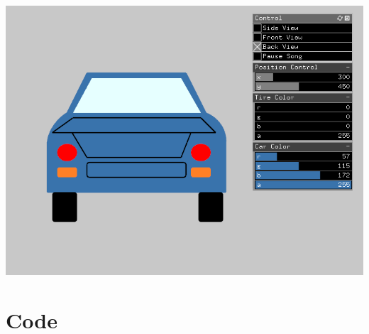 \documentclass[letterpaper, 24pt, final, onecolumn, titlepage] {article}
\begin{document}
\begin{center}\includegraphics{backView} \end{center}

\pagebreak

\section{Code}
\singlespacing
\end{document}
